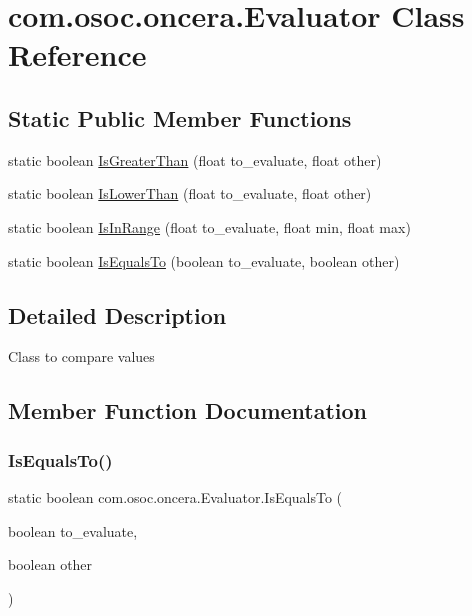 \hypertarget{classcom_1_1osoc_1_1oncera_1_1_evaluator}{}\section{com.\+osoc.\+oncera.\+Evaluator Class Reference}
\label{classcom_1_1osoc_1_1oncera_1_1_evaluator}
\subsection*{Static Public Member Functions}
\begin{DoxyCompactItemize}
\item 
static boolean \mbox{\hyperlink{classcom_1_1osoc_1_1oncera_1_1_evaluator_a40a29338e8c3c2c158b28ddc7c89f75a}{Is\+Greater\+Than}} (float to\+\_\+evaluate, float other)
\item 
static boolean \mbox{\hyperlink{classcom_1_1osoc_1_1oncera_1_1_evaluator_a89dea3efbfc3f1acb891f5ec24c6fab4}{Is\+Lower\+Than}} (float to\+\_\+evaluate, float other)
\item 
static boolean \mbox{\hyperlink{classcom_1_1osoc_1_1oncera_1_1_evaluator_acab172afa50918f5bc8fd61e1327a768}{Is\+In\+Range}} (float to\+\_\+evaluate, float min, float max)
\item 
static boolean \mbox{\hyperlink{classcom_1_1osoc_1_1oncera_1_1_evaluator_a93553105e8f8dc0a1e99563d3afc09f2}{Is\+Equals\+To}} (boolean to\+\_\+evaluate, boolean other)
\end{DoxyCompactItemize}


\subsection{Detailed Description}
Class to compare values 

\subsection{Member Function Documentation}
\mbox{\label{classcom_1_1osoc_1_1oncera_1_1_evaluator_a93553105e8f8dc0a1e99563d3afc09f2}} 
\subsubsection{\texorpdfstring{IsEqualsTo()}{IsEqualsTo()}}
{\footnotesize\ttfamily static boolean com.\+osoc.\+oncera.\+Evaluator.\+Is\+Equals\+To (\begin{DoxyParamCaption}\item[{boolean}]{to\+\_\+evaluate,  }\item[{boolean}]{other }\end{DoxyParamCaption})\hspace{0.3cm}{\ttfamily [static]}}


